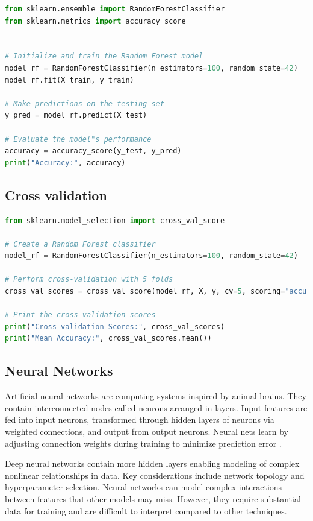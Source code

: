 \begin{lstlisting}[language=Python]
from sklearn.ensemble import RandomForestClassifier
from sklearn.metrics import accuracy_score


# Initialize and train the Random Forest model
model_rf = RandomForestClassifier(n_estimators=100, random_state=42)
model_rf.fit(X_train, y_train)

# Make predictions on the testing set
y_pred = model_rf.predict(X_test)

# Evaluate the model"s performance
accuracy = accuracy_score(y_test, y_pred)
print("Accuracy:", accuracy)
\end{lstlisting}



\subsection{Cross validation}
\begin{lstlisting}[language=Python]
from sklearn.model_selection import cross_val_score

# Create a Random Forest classifier
model_rf = RandomForestClassifier(n_estimators=100, random_state=42)

# Perform cross-validation with 5 folds
cross_val_scores = cross_val_score(model_rf, X, y, cv=5, scoring="accuracy")

# Print the cross-validation scores
print("Cross-validation Scores:", cross_val_scores)
print("Mean Accuracy:", cross_val_scores.mean())

\end{lstlisting}


\subsection{Neural Networks}

Artificial neural networks are computing systems inspired by animal brains. They contain interconnected nodes called neurons arranged in layers. Input features are fed into input neurons, transformed through hidden layers of neurons via weighted connections, and output from output neurons. Neural nets learn by adjusting connection weights during training to minimize prediction error \cite{picton1994neural}.

Deep neural networks contain more hidden layers enabling modeling of complex nonlinear relationships in data. Key considerations include network topology and hyperparameter selection. Neural networks can model complex interactions between features that other models may miss. However, they require substantial data for training and are difficult to interpret compared to other techniques.


